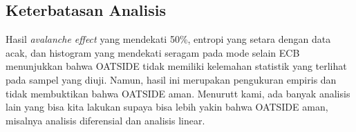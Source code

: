 \subsection{Keterbatasan Analisis}
Hasil \textit{avalanche effect} yang mendekati 50\%, entropi yang setara dengan data acak, dan histogram yang mendekati seragam pada mode selain ECB menunjukkan bahwa OATSIDE tidak memiliki kelemahan statistik yang terlihat pada sampel yang diuji. Namun, hasil ini merupakan pengukuran empiris dan tidak membuktikan bahwa OATSIDE aman. Menurutt kami, ada banyak analisis lain yang bisa kita lakukan supaya bisa lebih yakin bahwa OATSIDE aman, misalnya analisis diferensial dan analisis linear. 

\pagebreak
